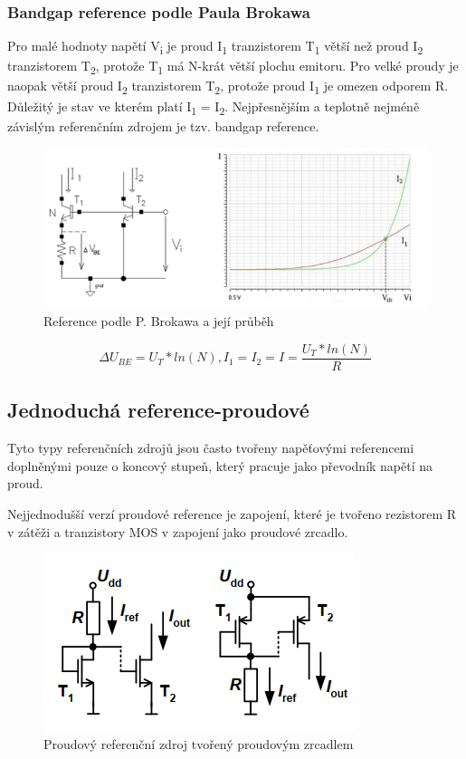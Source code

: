 \subsubsection{Bandgap reference podle Paula Brokawa}
Pro malé hodnoty napětí V\textsubscript{i} je proud I\textsubscript{1} tranzistorem T\textsubscript{1} větší než proud 
I\textsubscript{2} tranzistorem T\textsubscript{2}, protože T\textsubscript{1} má N-krát větší plochu emitoru. Pro velké proudy je naopak větší proud I\textsubscript{2} tranzistorem T\textsubscript{2}, protože proud I\textsubscript{1} je omezen odporem R. Důležitý je stav ve kterém platí I\textsubscript{1} = I\textsubscript{2}.
Nejpřesnějším a teplotně nejméně závislým referenčním zdrojem je tzv. bandgap reference.
\begin{figure}[h]
   \begin{center}
     \includegraphics[scale=0.8]{images/Brok.png}
   \end{center}
   \caption{Reference podle P. Brokawa a její průběh}
\end{figure}
\begin{equation}
\Delta U_{BE} = U_{T}*ln(N), I_{1} = I_{2} = I = \frac{U_{T}*ln(N)}{R}
\end{equation}

\subsection{Jednoduchá reference-proudové}
Tyto typy referenčních zdrojů jsou často tvořeny napěťovými referencemi doplněnými pouze o koncový stupeň, který pracuje jako převodník napětí na proud.

Nejjednodušší verzí proudové reference je zapojení, které je tvořeno rezistorem R v zátěži a tranzistory MOS v zapojení jako proudové zrcadlo.
\begin{figure}[h]
   \begin{center}
     \includegraphics[scale=0.6]{images/REFI.png}
   \end{center}
   \caption{Proudový referenční zdroj tvořený proudovým zrcadlem}
\end{figure}

